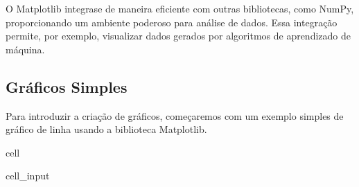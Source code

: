 \documentclass[letterpaper,10pt,english]{jupyterBook}
\begin{document}
\sphinxAtStartPar
{}

\sphinxAtStartPar
O Matplotlib integra\sphinxhyphen{}se de maneira eficiente com outras bibliotecas, como NumPy, proporcionando um ambiente poderoso para análise de dados. Essa integração permite, por exemplo, visualizar dados gerados por algoritmos de aprendizado de máquina.


\subsection{Gráficos Simples}
\label{\detokenize{chapters/ch7/ch7:graficos-simples}}
\sphinxAtStartPar
Para introduzir a criação de gráficos, começaremos com um exemplo simples de gráfico de linha usando a biblioteca Matplotlib.

\begin{sphinxuseclass}{cell}\begin{sphinxVerbatimInput}

\begin{sphinxuseclass}{cell_input}
\begin{sphinxVerbatim}[commandchars=\\\{\}]
   

  \PYG{p}{[}    \PYG{p}{]}
  \PYG{p}{[}    \PYG{p}{]}

     



\end{sphinxVerbatim}
\end{sphinxuseclass}
\end{sphinxVerbatimInput}
\end{sphinxuseclass}
\end{document}
